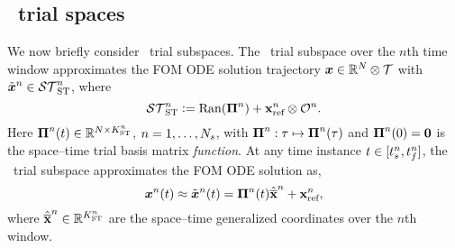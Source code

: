 \subsection{\spaceTimeAcronym\ trial spaces}\label{sec:wls_spacetime}

We now briefly consider \spaceTimeAcronym\ trial subspaces. 
The \spaceTimeAcronym\ trial subspace over the $n$th time window approximates
the FOM ODE solution trajectory ${\boldsymbol x}\in\mathbb{R}^{N}\otimes\mathcal{T}$
with $\tilde{\boldsymbol x}^{n} \in \mathcal{ ST }_{\text{ST}}^{n}$, where
\begin{equation}\label{eq:st_sttrialspace}
 \mathcal{ ST }_{\text{ST}}^{n} \vcentcolon=
 \mathrm{Ran}(\boldsymbol \Pi^{n}) + \mathbf{x}_\text{ref}^{n}\otimes \mathcal{O}^{n} .
\end{equation}
Here $\boldsymbol \Pi^{n}(t) \in \mathbb{R}^{N \times K_{\text{ST}}^{n}}$, $n=1,\ldots,N_s$, with $\boldsymbol \Pi^{n}: \tau \mapsto \boldsymbol \Pi^{n}(\tau)$ and $\boldsymbol \Pi^{n}(0) = \boldsymbol 0$ is the space--time trial basis matrix \textit{function}. At any time instance $t \in [t_s^{n},t_f^{n}]$, the \spaceTimeAcronym\ trial subspace approximates the FOM ODE solution as,
 \begin{equation}\label{eq:stapprox}
 {\boldsymbol x}^{n}(t) \approx \tilde{\boldsymbol x}^{n}(t)  = \boldsymbol \Pi^{n}(t) \hat{\mathbf{\overline{x}}}^{n} + \mathbf{x}_\text{ref}^{n},
\end{equation}
where $\hat{\mathbf{\overline{x}}}^{n} \in \mathbb{R}^{K_{\text{ST}}^{n}}$ are the space--time generalized coordinates over the $n$th window.

